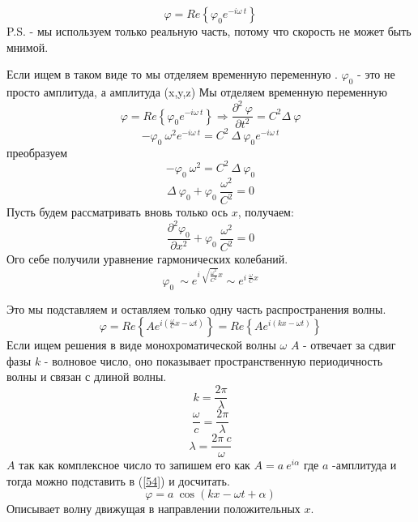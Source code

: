 \documentclass[14pt,a4paper,oneside]{extarticle}	%
\newcommand{\e}{e^{-i\omega\: t}}
\newcommand{\bracket}[1] {\left( #1 \right) } %
\newcommand{\dd}[1] {\partial #1 }
\begin{document}
\begin{equation}\label{52}
\varphi = Re\left\lbrace \varphi_{0}\e\right\rbrace 
\end{equation}
P.S. - мы используем только реальную часть, потому что скорость не может быть мнимой.

Если ищем в таком виде то мы отделяем временную переменную .
$ \varphi_{0} $ - это не просто амплитуда, а амплитуда (x,y,z)
Мы отделяем временную переменную 
\begin{equation}\label{53}
\varphi = Re\left\lbrace \varphi_{0}\e\right\rbrace \Rightarrow \frac{\dd{^{2}\:\varphi}}{\dd{t^{2}}} = C^{2}\Delta\:\varphi
\end{equation}
\begin{equation*}
-\varphi_{0}\: \omega^{2}\e = C^{2}\:\Delta\: \varphi_{0}\e
\end{equation*}
преобразуем
\begin{equation*}
-\varphi_{0}\: \omega^{2} = C^{2}\:\Delta\: \varphi_{0}
\end{equation*}
\begin{equation*}
\Delta\: \varphi_{0} + \varphi_{0}\: \frac{\omega^{2}}{C^{2}} = 0 
\end{equation*}
Пусть будем рассматривать вновь только ось $ x $, получаем:
\begin{equation*}
\frac{\dd{^{2}\varphi_{0}}}{\dd{x^{2}}} + \varphi_{0}\: \frac{\omega^{2}}{C^{2}} = 0 
\end{equation*}
Ого себе получили уравнение гармонических колебаний.
\begin{equation*}
\varphi_{0}\: \sim e^{i\:\sqrt{\frac{\omega^{2}}{C^{2}}}x}\sim e^{i\:\frac{\omega}{C}x} 
\end{equation*}

Это мы подставляем и оставляем только одну часть распространения волны.
\begin{equation}\label{54}
\varphi =  Re\left\lbrace Ae^{i\bracket{\frac{\omega}{C}x - \omega t}} \right\rbrace = Re\left\lbrace Ae^{i\bracket{kx - \omega t}} \right\rbrace 
\end{equation}
Если ищем решения в виде монохроматической волны $ \omega $
$ A $ - отвечает за сдвиг фазы
$ k $ - волновое число, оно показывает пространственную периодичность волны и связан с длиной волны.
\begin{equation*}
k = \frac{2\pi}{\lambda}
\end{equation*}
\begin{equation*}
\frac{\omega}{c} = \frac{2\pi}{\lambda}
\end{equation*}
\begin{equation*}
\lambda = \frac{2\pi\: c}{\omega}
\end{equation*}
$ A $ так как комплексное число то запишем его как $ A = a\:e^{i\alpha} $
где $ a $ -амплитуда и тогда можно подставить в (\ref{54}) и досчитать.
\begin{equation}\label{55}
\varphi =  a\: \cos(kx-\omega t + \alpha)
\end{equation}
Описывает волну движущая в направлении положительных $ x $.
\end{document}
